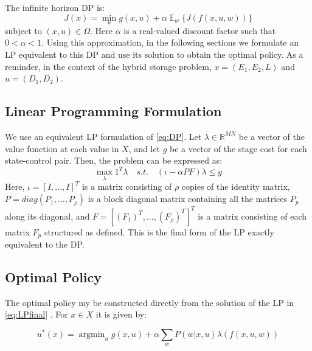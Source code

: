 \documentclass[conference]{IEEEtran}
\DeclareMathOperator*{\argmin}{argmin}
\DeclareMathOperator{\E}{\mathbb{E}}
\begin{document}
The infinite horizon DP is:
\begin{equation} \label{eq:DP}
J(x)=\min_{u} g(x,u) + \alpha\mathop{\E}_{w} \{J(f(x,u,w))\}
\end{equation} subject to $(x,u)\in\Omega$. Here $\alpha$ is a real-valued discount factor such that $0<\alpha<1$. Using this approximation, in the following sections we formulate an LP equivalent to this DP and use its solution to obtain the optimal policy. As a reminder, in the context of the hybrid storage problem, $x=(E_{1},E_{2},L)$ and $u=(D_{1},D_{2})$.


\subsection{Linear Programming Formulation}
We use an equivalent LP formulation of \eqref{eq:DP}. Let $\lambda\in\mathbb{R}^{MN}$ be a vector of the value function at each value in $X$, and let $g$ be a vector of the stage cost for each state-control pair. Then, the problem can be expressed as:
\begin{equation} \label{eq:LPfinal}
    \max_{\lambda} 1^{T} \lambda
    \hspace{1em}s.t.\hspace{1em}
    (\iota-\alpha PF)\lambda \leq g
\end{equation} Here, $\iota=[I,...,I]^{T}$ is a matrix consisting of $\rho$ copies of the identity matrix, $P=diag(P_{1},...,P_{\rho})$ is a block diagonal matrix containing all the matrices $P_{p}$ along its diagonal, and $F=[(F_{1})^{T},...,(F_{\rho})^{T}]^{T}$ is a matrix consisting of each matrix $F_{p}$ structured as defined. %
This is the final form of the LP exactly equivalent to the DP. 

\subsection{Optimal Policy}
The optimal policy my be constructed directly from the solution of the LP in \eqref{eq:LPfinal} \cite{Bertsekas:2007:DPO:1396348}. For $x\in X$ it is given by:

\begin{equation}
    u^{*}(x)=\argmin_{u} g(x,u)+\alpha \sum_{w} P(w|x,u)\lambda(f(x,u,w))
\end{equation}
\end{document}
